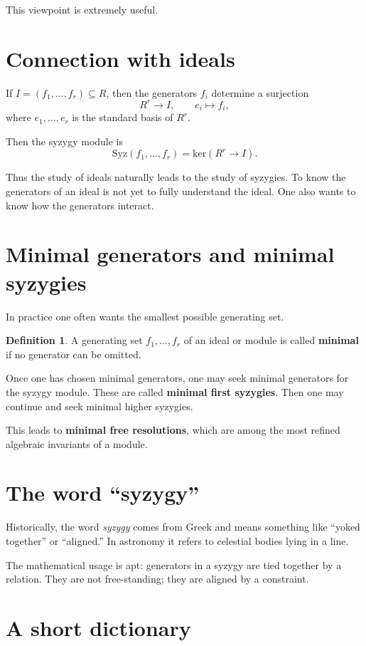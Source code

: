 \documentclass[11pt]{article}
\theoremstyle{definition}
\newtheorem{definition}[theorem]{Definition}
\theoremstyle{remark}
\newcommand{\Syz}{\mathrm{Syz}}
\newcommand{\kerR}{\mathrm{ker}}
\begin{document}
	This viewpoint is extremely useful.
	
	\section{Connection with ideals}
	
	If \(I=(f_1,\dots,f_r)\subseteq R\), then the generators \(f_i\) determine a surjection
	\[
	R^r\to I,\qquad e_i\mapsto f_i,
	\]
	where \(e_1,\dots,e_r\) is the standard basis of \(R^r\).
	
	Then the syzygy module is
	\[
	\Syz(f_1,\dots,f_r)=\kerR(R^r\to I).
	\]
	
	Thus the study of ideals naturally leads to the study of syzygies. To know the generators of an ideal is not yet to fully understand the ideal. One also wants to know how the generators interact.
	
	\section{Minimal generators and minimal syzygies}
	
	In practice one often wants the smallest possible generating set.
	
	\begin{definition}
		A generating set \(f_1,\dots,f_r\) of an ideal or module is called \textbf{minimal} if no generator can be omitted.
	\end{definition}
	
	Once one has chosen minimal generators, one may seek minimal generators for the syzygy module. These are called \textbf{minimal first syzygies}. Then one may continue and seek minimal higher syzygies.
	
	This leads to \textbf{minimal free resolutions}, which are among the most refined algebraic invariants of a module.
	
	\section{The word ``syzygy''}
	
	Historically, the word \emph{syzygy} comes from Greek and means something like ``yoked together'' or ``aligned.'' In astronomy it refers to celestial bodies lying in a line.
	
	The mathematical usage is apt: generators in a syzygy are tied together by a relation. They are not free-standing; they are aligned by a constraint.
	
	\section{A short dictionary}
	
\end{document}

